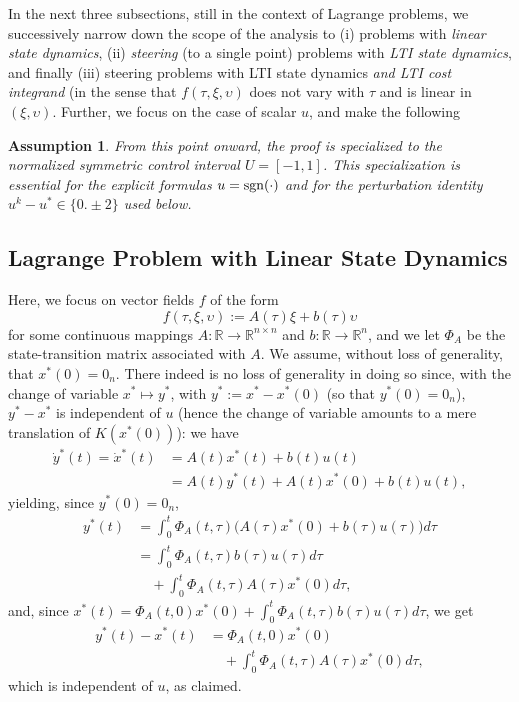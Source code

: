 \documentclass[letterpaper,10pt,conference]{ieeeconf}
\def\R{{\mathbb{R}}}
\newtheorem{assumption}{Assumption}
\begin{document}
In the next three subsections, still in the context of Lagrange problems,
we successively narrow down the scope of the analysis to 
(i) problems with {\em linear state dynamics}, 
(ii) {\em steering} (to a single point) problems with {\em LTI state dynamics}, 
and finally 
(iii) steering problems
with LTI state dynamics {\em and LTI cost integrand} (in the sense that
$f(\tau,\xi,\upsilon)$ does not vary with $\tau$ and is linear in 
$(\xi,\upsilon)$.  Further, we focus on the case of scalar $u$, and
make the following
\begin{assumption}
From this point onward, the proof is specialized to the normalized symmetric
control interval $U=[-1,1]$.  This specialization is essential for the
explicit formulas $u={\rm sgn}(\cdot)$ and for the perturbation identity
$u^k-u^*\in\{0.\pm2\}$ used below.
\end{assumption}


\subsection{Lagrange Problem with Linear State Dynamics}
\label{sec:LTI dynamics}

Here, we focus on vector fields $f$ of the form
\begin{equation}
\label{eq:LTI dynamics}
f(\tau,\xi,\upsilon):=A(\tau)\xi+b(\tau)\upsilon
\end{equation}
for some continuous mappings $A:\R\to\R^{n\times n}$ and $b:\R\to\R^n$, and
we let $\Phi_A$ be the state-transition matrix associated with $A$.
We assume, without loss of generality, that $x^*(0)=0_n$.  
There indeed is no loss of generality 
in doing so since, 
with the change of variable $x^*\mapsto y^*$, with
$y^*:=x^*-x^*(0)$ (so that $y^*(0)=0_n$), $y^*-x^*$ is independent of $u$
(hence the change of variable amounts to a mere translation of 
$K(x^*(0))$): we have
\[
\begin{aligned}
\dot y^*(t)=\dot x^*(t) &=  A(t)x^*(t) + b(t)u(t) \\
&= A(t)y^*(t) + A(t)x^*(0)+ b(t)u(t),
\end{aligned}
\]
yielding, since $y^*(0)=0_n$,
\[
\begin{aligned}
y^*(t)&=\int_0^t\Phi_A(t,\tau)
\bigl(A(\tau)x^*(0)+b(\tau)u(\tau)\bigr)d\tau\\
&=\int_0^t\Phi_A(t,\tau)b(\tau)u(\tau)d\tau\\
&\quad+\int_0^t\Phi_A(t,\tau)A(\tau)x^*(0)d\tau,
\end{aligned}
\]
and, since $x^*(t)=\Phi_A(t,0)x^*(0)+\int_0^t\Phi_A(t,\tau)b(\tau)u(\tau)d\tau$,
we get
\[
\begin{aligned}
y^*(t) - x^*(t) &= \Phi_A(t,0)x^*(0)\\
&\quad+\int_0^t\Phi_A(t,\tau)A(\tau)x^*(0) d\tau,
\end{aligned}
\]
which is independent of $u$, as claimed.
\end{document}
